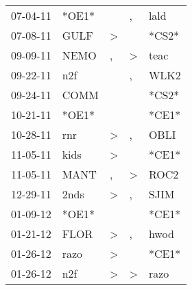 \begin{supertabular}{p{0.07\textwidth}p{0.06\textwidth}p{0.02\textwidth}p{0.02\textwidth}p{0.06\textwidth}}
          07-04-11\textsuperscript{} &                            *OE1* &                  &                , &           lald\textsuperscript{} \\
          07-08-11\textsuperscript{} &           GULF\textsuperscript{} &     \textgreater &                  &                            *CS2* \\
          09-09-11\textsuperscript{} &           NEMO\textsuperscript{} &                , &     \textgreater &           teac\textsuperscript{} \\
          09-22-11\textsuperscript{} &            n2f\textsuperscript{} &                  &                , &           WLK2\textsuperscript{} \\
          09-24-11\textsuperscript{} &           COMM\textsuperscript{} &                  &                  &                            *CS2* \\
          10-21-11\textsuperscript{} &                            *OE1* &                  &                  &                            *CE1* \\
          10-28-11\textsuperscript{} &            rnr\textsuperscript{} &     \textgreater &                , &           OBLI\textsuperscript{} \\
          11-05-11\textsuperscript{} &           kids\textsuperscript{} &     \textgreater &                  &                            *CE1* \\
          11-05-11\textsuperscript{} &           MANT\textsuperscript{} &                , &     \textgreater &           ROC2\textsuperscript{} \\
          12-29-11\textsuperscript{} &           2nds\textsuperscript{} &     \textgreater &                , &           SJIM\textsuperscript{} \\
          01-09-12\textsuperscript{} &                            *OE1* &                  &                  &                            *CE1* \\
          01-21-12\textsuperscript{} &           FLOR\textsuperscript{} &     \textgreater &                , &           hwod\textsuperscript{} \\
          01-26-12\textsuperscript{} &           razo\textsuperscript{} &     \textgreater &                  &                            *CE1* \\
          01-26-12\textsuperscript{} &            n2f\textsuperscript{} &     \textgreater &     \textgreater &           razo\textsuperscript{} \\

\end{supertabular}
